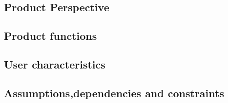 \subsection{Product Perspective}


\subsection{Product functions}


\subsection{User characteristics}


\subsection{Assumptions,dependencies and constraints}
